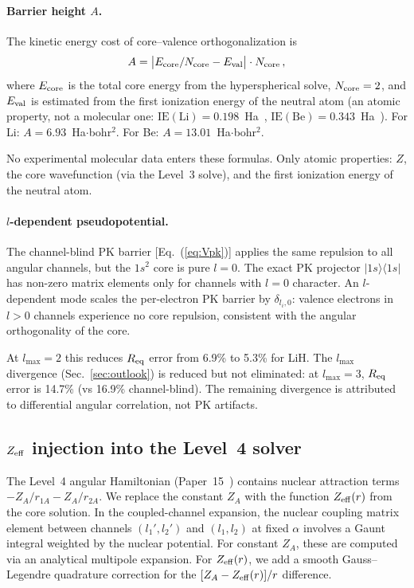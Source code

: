 \documentclass[aps,pra,twocolumn,superscriptaddress,longbibliography,floatfix]{revtex4-2}
\begin{document}
\paragraph{Barrier height $A$.}
The kinetic energy cost of core--valence orthogonalization is
\begin{equation}
  A = \bigl|E_{\rm core}/N_{\rm core} - E_{\rm val}\bigr|
      \cdot N_{\rm core}\,,
  \label{eq:A}
\end{equation}
where $E_{\rm core}$ is the total core energy from the hyperspherical
solve, $N_{\rm core} = 2$, and $E_{\rm val}$ is estimated from the
first ionization energy of the neutral atom (an atomic property, not
a molecular one: $\text{IE}(\text{Li}) = 0.198$~Ha~\cite{nist},
$\text{IE}(\text{Be}) = 0.343$~Ha~\cite{nist}).
For Li: $A = 6.93$~Ha$\cdot$bohr$^2$.
For Be: $A = 13.01$~Ha$\cdot$bohr$^2$.

No experimental molecular data enters these formulas.  Only atomic
properties: $Z$, the core wavefunction (via the Level~3 solve), and
the first ionization energy of the neutral atom.

\paragraph{$l$-dependent pseudopotential.}
The channel-blind PK barrier [Eq.~(\ref{eq:Vpk})] applies the
same repulsion to all angular channels, but the $1s^2$ core is
pure $l = 0$.  The exact PK projector $|1s\rangle\langle 1s|$ has
non-zero matrix elements only for channels with $l = 0$ character.
An $l$-dependent mode scales the per-electron PK barrier by
$\delta_{l_i, 0}$: valence electrons in $l > 0$ channels
experience no core repulsion, consistent with the angular
orthogonality of the core.

At $l_{\max} = 2$ this reduces $R_{\rm eq}$ error from 6.9\% to
5.3\% for LiH.  The $l_{\max}$ divergence (Sec.~\ref{sec:outlook})
is reduced but not eliminated: at $l_{\max} = 3$, $R_{\rm eq}$
error is 14.7\% (vs 16.9\% channel-blind).  The remaining divergence
is attributed to differential angular correlation, not PK artifacts.


\subsection{\texorpdfstring{$Z_{\rm eff}$}{Z\_eff} injection into the
Level~4 solver}
\label{sec:injection}

The Level~4 angular Hamiltonian (Paper~15~\cite{paper15}) contains
nuclear attraction terms $-Z_A/r_{1A} - Z_A/r_{2A}$.  We replace
the constant $Z_A$ with the function $Z_{\rm eff}(r)$ from the core
solution.  In the coupled-channel expansion, the nuclear coupling
matrix element between channels $(l_1', l_2')$ and $(l_1, l_2)$ at
fixed $\alpha$ involves a Gaunt integral weighted by the nuclear
potential.  For constant $Z_A$, these are computed via an analytical
multipole expansion.  For $Z_{\rm eff}(r)$, we add a smooth
Gauss--Legendre quadrature correction for the
$[Z_A - Z_{\rm eff}(r)]/r$ difference.
\end{document}
